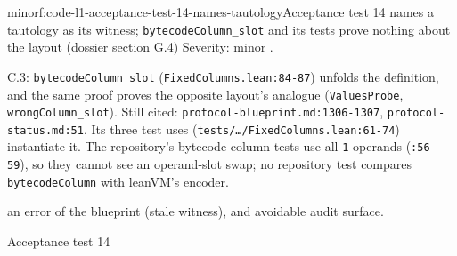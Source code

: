 \begin{finding}{minor}{f:code-l1-acceptance-test-14-names-tautology}{Acceptance test 14 names a tautology as its witness; \texttt{bytecodeColumn\_\allowbreak{}slot} and its tests prove nothing about the layout (dossier section G.4)}
Severity: minor .

C.3: \texttt{bytecodeColumn\_\allowbreak{}slot} (\texttt{FixedColumns.\allowbreak{}lean:84-{}87}) unfolds the definition, and the same proof proves the opposite layout's analogue (\texttt{ValuesProbe}, \texttt{wrongColumn\_\allowbreak{}slot}). Still cited: \texttt{p\allowbreak{}r\allowbreak{}o\allowbreak{}t\allowbreak{}o\allowbreak{}c\allowbreak{}o\allowbreak{}l\allowbreak{}-{}\allowbreak{}b\allowbreak{}l\allowbreak{}u\allowbreak{}e\allowbreak{}p\allowbreak{}r\allowbreak{}i\allowbreak{}n\allowbreak{}t\allowbreak{}.\allowbreak{}m\allowbreak{}d\allowbreak{}:\allowbreak{}1\allowbreak{}3\allowbreak{}0\allowbreak{}6\allowbreak{}-{}\allowbreak{}1\allowbreak{}3\allowbreak{}0\allowbreak{}7}, \texttt{protocol-{}status.\allowbreak{}md:51}. Its three test uses (\texttt{t\allowbreak{}e\allowbreak{}s\allowbreak{}t\allowbreak{}s\allowbreak{}/\allowbreak{}…\allowbreak{}/\allowbreak{}F\allowbreak{}i\allowbreak{}x\allowbreak{}e\allowbreak{}d\allowbreak{}C\allowbreak{}o\allowbreak{}l\allowbreak{}u\allowbreak{}m\allowbreak{}n\allowbreak{}s\allowbreak{}.\allowbreak{}l\allowbreak{}e\allowbreak{}a\allowbreak{}n\allowbreak{}:\allowbreak{}6\allowbreak{}1\allowbreak{}-{}\allowbreak{}7\allowbreak{}4}) instantiate it. The repository's bytecode-column tests use all-\texttt{1} operands (\texttt{:56-{}59}), so they cannot see an operand-slot swap; no repository test compares \texttt{bytecodeColumn} with leanVM's encoder.

an error of the blueprint (stale witness), and avoidable audit surface.

Acceptance test 14


\end{finding}
